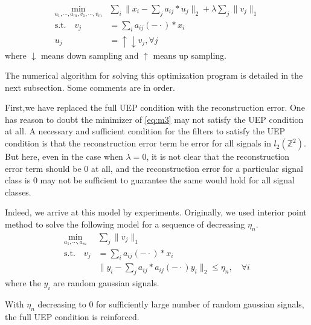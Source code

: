 \documentclass[a4paper]{article}
\begin{document}
{\begin{equation}
\label{eq:m3}
\begin{aligned}
	\min_{a_1,\cdots,a_m, v_1,\cdots,v_m}& \sum_i \|x_i - \sum_j a_{ij}*u_j\|_2 +\lambda \sum_j \|v_j\|_1 \\
	 \textrm{s.t.}  \quad v_j& = \sum_{i} a_{ij}(-\cdot)*x_i \\
		u_j&=\uparrow\downarrow v_j, \forall j
	\end{aligned}
\end{equation}
where $\downarrow$ means down sampling and $\uparrow$ means up sampling.

The numerical algorithm for solving this optimization program is detailed in the next subsection.   Some comments are in order.

First,we have replaced the full UEP condition with the reconstruction error. One has reason to doubt the minimizer of \eqref{eq:m3} may not satisfy the UEP condition at all. A necessary and sufficient condition for the filters to satisfy the UEP condition is that  the reconstruction error term be error for all signals in $l_2(\mathbb Z^2)$. But here, even in the case when $\lambda=0$, it is not clear that the reconstruction error term should be $0$ at all, and the reconstruction error for a particular signal class is $0$ may not be sufficient to guarantee the same would hold for all signal classes.

Indeed, we arrive at this model by experiments. Originally, we used interior point method to solve the following model for a sequence of decreasing $\eta_n$.
\begin{equation}
\begin{aligned}
	\min_{a_1,\cdots,a_m} & \sum_j\| v_j\|_1  \\
		 \textrm{s.t.}  \quad v_j& = \sum_{i} a_{ij}(-\cdot)*x_i \\
		&\|y_i - \sum_j a_{ij}*a_{ij}(-\cdot)y_i\|_2 \leq \eta_n,\quad  \forall i
	\end{aligned}
\end{equation}
where the $y_i$ are random gaussian signals.

With $\eta_n$ decreasing to $0$ for sufficiently large number of random gaussian signals, the full UEP condition is reinforced. 

}
\end{document}
